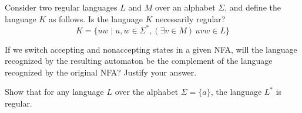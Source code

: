 \documentclass[a4paper,12pt]{amsart}
\begin{document}
\medskip\begin{problem}[Cut] 
    Consider two regular languages $L$ and $M$ over an alphabet $\Sigma$, and define the language $K$ as follows. Is the language $K$ necessarily regular? 
    $$  
    K=\{uw\mid u,w\in\Sigma^*, (\exists v\in M)\, uvw\in L\}  
    $$
\end{problem}  


\medskip\begin{problem}
    
    If we switch accepting and nonaccepting states in a given NFA, will the language recognized by the resulting automaton be the complement of the language recognized by the original NFA? Justify your answer.

\end{problem}


\medskip\begin{problem}
    
    Show that for any language $L$ over the alphabet $\Sigma=\{a\}$, the language $L^*$ is regular. 


\end{problem}
\end{document}
